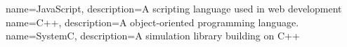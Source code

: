  		{ name=JavaScript,	description={A scripting language used in web development}}
 		{name=C++, description={A object-oriented programming language.}}
 		{name=SystemC, description={A simulation library building on C++}}


